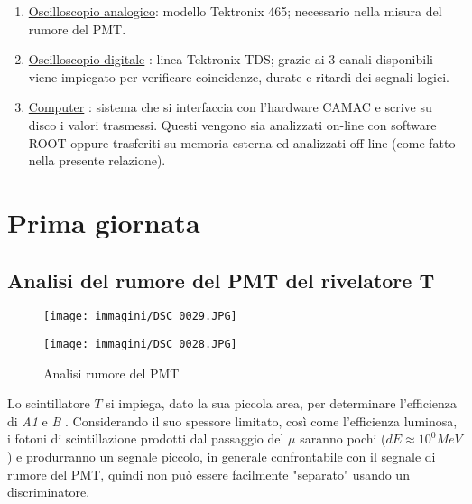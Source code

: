 \documentclass[12pt,a4paper,openright,twoside]{article}
\numberwithin{equation}{section} %
\begin{document}
\begin{enumerate}
\begin{enumerate}
\end{enumerate}

\item \underline{Oscilloscopio analogico}: modello Tektronix 465; necessario nella misura del rumore del PMT.
\item \underline{Oscilloscopio digitale} : linea Tektronix TDS; grazie ai 3 canali disponibili viene impiegato per verificare coincidenze, durate e ritardi dei segnali logici.
\item \underline{Computer} : sistema che si interfaccia con l'hardware CAMAC e scrive su disco i valori trasmessi. Questi vengono sia analizzati on-line con software ROOT oppure trasferiti su memoria esterna ed analizzati off-line (come fatto nella presente relazione). 
\end{enumerate}

\section{Prima giornata}
\subsection{Analisi del rumore del PMT del rivelatore \textbf{T}}

\begin{figure}[htbp]
\begin{center}
\begin{minipage}[c]{0.4\textwidth}
\texttt{[image: immagini/DSC\_0029.JPG]}
\end{minipage}
\hspace{8mm}
\begin{minipage}[c]{.45\textwidth}
\texttt{[image: immagini/DSC\_0028.JPG]}
\end{minipage}%
\caption{Analisi rumore del PMT}
\label{oscillo}
\end{center}
\end{figure}


Lo scintillatore $T$ si impiega, dato la sua piccola area, per determinare l'efficienza di \textit{A1} e \textit{B} .
Considerando il suo spessore limitato, così come l'efficienza luminosa, i fotoni di scintillazione prodotti dal passaggio del $\mu$ saranno pochi ($dE \approx 10^0 MeV$) e produrranno un segnale piccolo, in generale confrontabile con il segnale di rumore del PMT, quindi non può essere facilmente "separato" usando un discriminatore.
\end{document}

